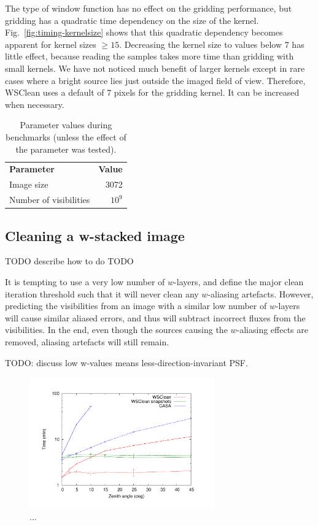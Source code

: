 \documentclass[useAMS,usenatbib]{mn2e}
\begin{document}
The type of window function has no effect on the gridding performance, but gridding has a quadratic time dependency on the size of the kernel. Fig.~\ref{fig:timing-kernelsize} shows that this quadratic dependency becomes apparent for kernel sizes $\ge 15$. Decreasing the kernel size to values below $7$ has little effect, because reading the samples takes more time than gridding with small kernels. We have not noticed much benefit of larger kernels except in rare cases where a bright source lies just outside the imaged field of view. Therefore, WSClean uses a default of 7 pixels for the gridding kernel. It can be increased when necessary.

\begin{table}
 \caption{Parameter values during benchmarks (unless the effect of the parameter was tested).}
 \begin{tabular}{lr}
   \textbf{Parameter} & \textbf{Value} \\
   Image size             & 3072 \\
   Number of visibilities & $10^9$
 \end{tabular}
\end{table}

\subsection{Cleaning a w-stacked image}
TODO describe how to do
TODO \citet{hogbom-clean}

It is tempting to use a very low number of $w$-layers, and define the major clean iteration threshold such that it will never clean any $w$-aliasing artefacts. However, predicting the visibilities from an image with a similar low number of $w$-layers will cause similar aliased errors, and thus will subtract incorrect fluxes from the visibilities. In the end, even though the sources causing the $w$-aliasing effects are removed, aliasing artefacts will still remain.

TODO: discuss low w-values means less-direction-invariant PSF.


\begin{figure}
\begin{center}
\includegraphics[width=8cm]{img/benchmark-zenith-angle/za}
\caption{...}
\label{fig:timing-zenith-angle}
\end{center}
\end{figure}
\end{document}
